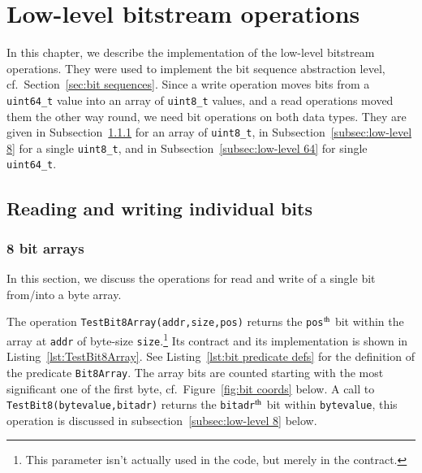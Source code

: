 
\chapter{Low-level bitstream operations}
\label{cha:low-level bitstream}

In this chapter, we describe the implementation of the
low-level bitstream operations.
%
They were used to implement the bit sequence abstraction level, cf.\
Section~\ref{sec:bit sequences}.
%
Since a write operation moves bits from a \lstinline{uint64_t} value
into an array of \lstinline{uint8_t} values, and a read operations
moved them the other way round,
we need bit operations on both data types.
%
They are given in
Subsection~\ref{subsec:low-level 8 array} 
for an array of \lstinline{uint8_t}, 
in Subsection~\ref{subsec:low-level 8} for a single \lstinline{uint8_t},
and
in Subsection~\ref{subsec:low-level 64} for single \lstinline{uint64_t}.













\section{Reading and writing individual bits}


\subsection{8 bit arrays}
\label{subsec:low-level 8 array}


In this section, we discuss the operations for read and write of a
single bit from/into a byte array.

The operation \lstinline{TestBit8Array(addr,size,pos)} returns the
\lstinline{pos}$^{\mbox{\scriptsize th}}$ bit
within the array at \lstinline{addr}
of byte-size \lstinline{size}.\footnote{
	This parameter isn't actually used in the code, but merely
	in the contract.
}
Its contract and its implementation is shown in
Listing~\ref{lst:TestBit8Array}.
%
See Listing~\ref{lst:bit predicate defs} for the definition of the predicate
\lstinline{Bit8Array}.
%
The array bits are counted starting with the most significant one of
the first byte,
cf.\ Figure~\ref{fig:bit coords} below.
%
A call to \lstinline{TestBit8(bytevalue,bitadr)} returns the 
\lstinline{bitadr}$^{\mbox{\scriptsize th}}$ bit
within \lstinline{bytevalue}, this operation is discussed in
subsection~\ref{subsec:low-level 8} below.








